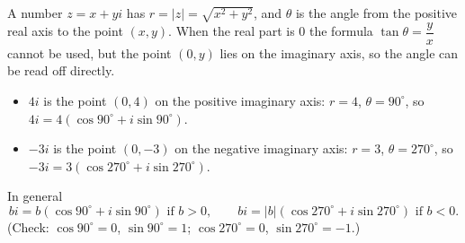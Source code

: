A number $z=x+yi$ has $r=|z|=\sqrt{x^2+y^2}$, and $\theta$ is the angle from the positive real axis to the point $(x,y)$. When the real part is $0$ the formula $\tan\theta=\dfrac {y}{x}$ cannot be used, but the point $(0,y)$ lies on the imaginary axis, so the angle can be read off directly.
\begin{itemize}
\item $4i$ is the point $(0,4)$ on the positive imaginary axis: $r=4$, $\theta=90^\circ$, so $4i=4\left(\cos90^\circ+i\sin90^\circ\right)$.
\item $-3i$ is the point $(0,-3)$ on the negative imaginary axis: $r=3$, $\theta=270^\circ$, so $-3i=3\left(\cos270^\circ+i\sin270^\circ\right)$.
\end{itemize}
In general
\[
\boxed{bi=b\left(\cos90^\circ+i\sin90^\circ\right)\text{ if }b>0,\qquad bi=|b|\left(\cos270^\circ+i\sin270^\circ\right)\text{ if }b<0}.
\]
(Check: $\cos90^\circ=0$, $\sin90^\circ=1$; $\cos270^\circ=0$, $\sin270^\circ=-1$.)
